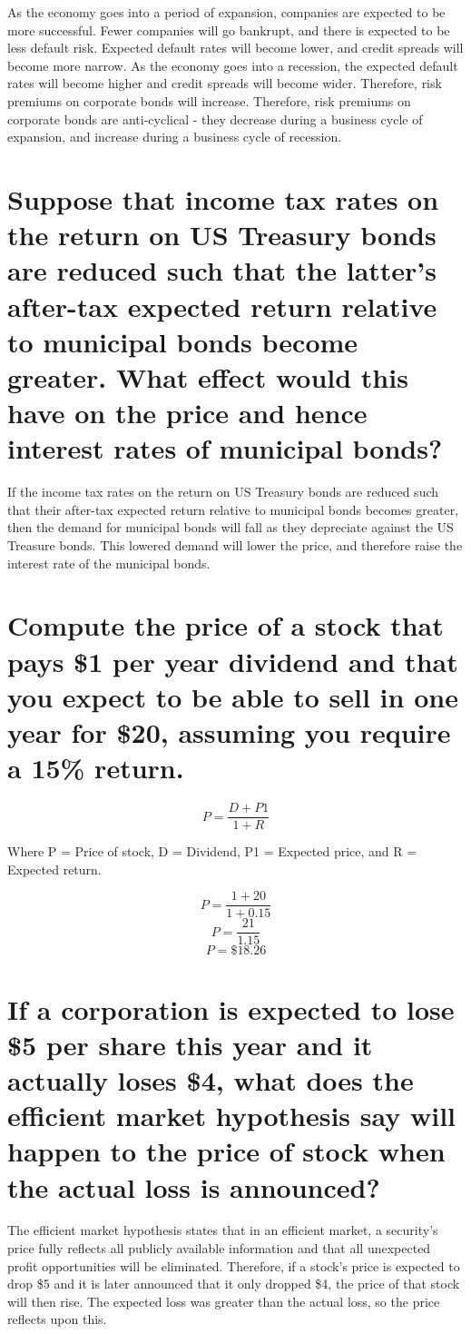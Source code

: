 \documentclass[12pt]{article}
\begin{document}
As the economy goes into a period of expansion, companies are expected
to be more successful. Fewer companies will go bankrupt, and there is
expected to be less default risk. Expected default rates will become
lower, and credit spreads will become more narrow. As the economy goes
into a recession, the expected default rates will become higher and credit
spreads will become wider. Therefore, risk premiums on corporate bonds
will increase.  Therefore, risk premiums on corporate bonds are
anti-cyclical - they decrease during a business cycle of expansion, and
increase during a business cycle of recession.

\section{Suppose that income tax rates on the return on US Treasury bonds are
reduced such that the latter's after-tax expected return relative to municipal
bonds become greater. What effect would this have on the price and hence 
interest rates of municipal bonds?}

If the income tax rates on the return on US Treasury bonds are reduced such that
their after-tax expected return relative to municipal bonds becomes greater,
then the demand for municipal bonds will fall as they depreciate against the US
Treasure bonds. This lowered demand will lower the price, and therefore raise
the interest rate of the municipal bonds.

\section{Compute the price of a stock that pays \$1 per year dividend and that
you expect to be able to sell in one year for \$20, assuming you require a 
15\% return.}

$$P = \frac{D + P1}{1 + R}$$

Where P = Price of stock, D = Dividend, P1 = Expected price, and R = Expected 
return.

$$P = \frac{1 + 20}{1 + 0.15}$$ 
$$P = \frac{21}{1.15}$$ 
$$P = \$18.26$$

\section{If a corporation is expected to lose \$5 per share this year and it
actually loses \$4, what does the efficient market hypothesis say will happen 
to the price of stock when the actual loss is announced?}

The efficient market hypothesis states that in an efficient market, a
security's price fully reflects all publicly available information and
that all unexpected profit opportunities will be eliminated. Therefore, if
a stock's price is expected to drop \$5 and it is later announced that it
only dropped \$4, the price of that stock will then rise. The expected loss
was greater than the actual loss, so the price reflects upon this.
\end{document}
